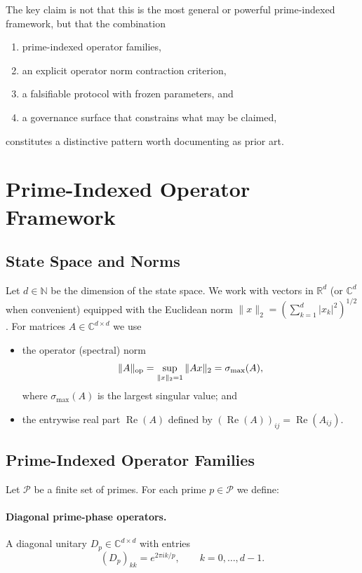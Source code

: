 \documentclass[11pt,letterpaper]{article}
\begin{document}
The key claim is not that this is the most general or powerful
prime-indexed framework, but that the combination

\begin{enumerate}[leftmargin=*]
  \item prime-indexed operator families,
  \item an explicit operator norm contraction criterion,
  \item a falsifiable protocol with frozen parameters, and
  \item a governance surface that constrains what may be claimed,
\end{enumerate}

constitutes a distinctive pattern worth documenting as prior art.

\section{Prime-Indexed Operator Framework}

\subsection{State Space and Norms}

Let \(d\in\mathbb{N}\) be the dimension of the state space.
We work with vectors in \(\mathbb{R}^d\) (or \(\mathbb{C}^d\)
when convenient) equipped with the Euclidean norm
\(\|x\|_2 = (\sum_{k=1}^d |x_k|^2)^{1/2}\).
For matrices \(A\in\mathbb{C}^{d\times d}\) we use

\begin{itemize}[leftmargin=*]
  \item the operator (spectral) norm
  \[
    \|A\|_{\rm op} = \sup_{\|x\|_2=1} \|Ax\|_2 = \sigma_{\max}(A),
  \]
    where \(\sigma_{\max}(A)\) is the largest singular value; and
  \item the entrywise real part \(\operatorname{Re}(A)\) defined by
    \((\operatorname{Re}(A))_{ij} = \operatorname{Re}(A_{ij})\).
\end{itemize}

\subsection{Prime-Indexed Operator Families}

Let \(\mathcal{P}\) be a finite set of primes. For each prime \(p\in\mathcal{P}\)
we define:

\paragraph{Diagonal prime-phase operators.}
A diagonal unitary \(D_p\in\mathbb{C}^{d\times d}\) with entries
\[
  (D_p)_{kk} = e^{2\pi i k/p}, \qquad k = 0, \dots, d-1.
\]
\end{document}
